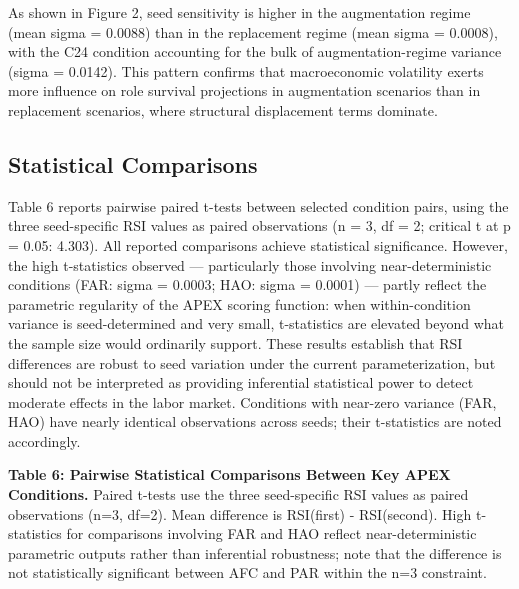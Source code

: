 \documentclass[10pt, conference]{IEEEtran}
\begin{document}
As shown in Figure 2, seed sensitivity is higher in the augmentation regime (mean sigma = 0.0088) than in the replacement regime (mean sigma = 0.0008), with the C24 condition accounting for the bulk of augmentation-regime variance (sigma = 0.0142). This pattern confirms that macroeconomic volatility exerts more influence on role survival projections in augmentation scenarios than in replacement scenarios, where structural displacement terms dominate.



\subsection{Statistical Comparisons}

\label{sec:statistical_comparisons}

Table 6 reports pairwise paired t-tests between selected condition pairs, using the three seed-specific RSI values as paired observations (n = 3, df = 2; critical t at p = 0.05: 4.303). All reported comparisons achieve statistical significance. However, the high t-statistics observed --- particularly those involving near-deterministic conditions (FAR: sigma = 0.0003; HAO: sigma = 0.0001) --- partly reflect the parametric regularity of the APEX scoring function: when within-condition variance is seed-determined and very small, t-statistics are elevated beyond what the sample size would ordinarily support. These results establish that RSI differences are robust to seed variation under the current parameterization, but should not be interpreted as providing inferential statistical power to detect moderate effects in the labor market. Conditions with near-zero variance (FAR, HAO) have nearly identical observations across seeds; their t-statistics are noted accordingly.

\textbf{Table 6: Pairwise Statistical Comparisons Between Key APEX Conditions.} Paired t-tests use the three seed-specific RSI values as paired observations (n=3, df=2). Mean difference is RSI(first) - RSI(second). High t-statistics for comparisons involving FAR and HAO reflect near-deterministic parametric outputs rather than inferential robustness; note that the difference is not statistically significant between AFC and PAR within the n=3 constraint.
\end{document}
